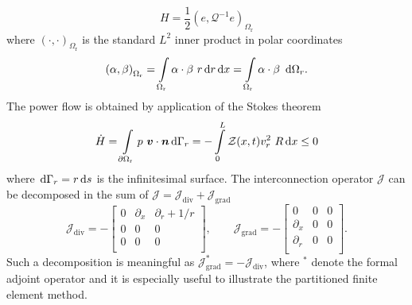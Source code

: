\documentclass{ifacconf}
\begin{document}
\[
H = \frac{1}{2} \left(e, \mathcal{Q}^{-1} e  \right)_{\Omega_{\text{r}}}
\]
where $\left(\cdot, \cdot \right)_{\Omega_{\text{r}}}$ is the standard $L^2$ inner product in polar coordinates
\[
\left(\alpha, \beta \right)_{\Omega_{\text{r}}} = \int_{\Omega_{\text{r}}} \alpha \cdot \beta \ r \d{r} \d{x} = \int_{\Omega_{\text{r}}} \alpha \cdot \beta \ \d{\Omega_r}.
\]
The power flow is obtained by application of the Stokes theorem
\[
\dot{H} = \int_{\partial \Omega_{\text{r}}} p \ \bm{v} \cdot \bm{n} \d{\Gamma_r} = - \int_{0}^{L} \mathcal{Z}(x, t) v_r^2 \ R \d{x} \le 0 
\]
where $\,\mathrm{d}{\Gamma_r} = r \,\mathrm{d}{s}$ is the infinitesimal surface. The interconnection operator $\mathcal{J}$ can be decomposed in the sum of $\mathcal{J} = \mathcal{J}_{\text{div}} + \mathcal{J}_{\text{grad}}$
\begin{equation}
\label{eq:J_dec}
    \mathcal{J}_{\text{div}} = -\begin{bmatrix}
    0 & \partial_x & \partial_r + 1/r \\
    0 & 0 & 0 \\
    0 & 0 & 0 \\
    \end{bmatrix}, \qquad 
    \mathcal{J}_{\text{grad}} = -\begin{bmatrix}
    0 & 0 & 0 \\
    \partial_x & 0 & 0 \\
    \partial_r & 0 & 0 \\
    \end{bmatrix}.
\end{equation}
Such a decomposition is meaningful as $\mathcal{J}_{\text{grad}}^* = -\mathcal{J}_{\text{div}}$, where $^*$ denote the formal adjoint operator and it is especially useful to illustrate the partitioned finite element method. 
\end{document}

